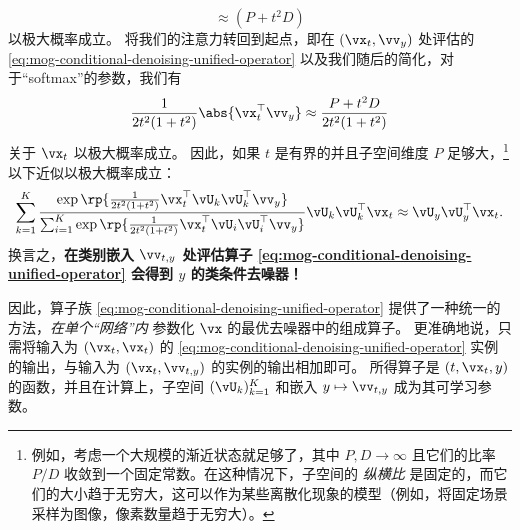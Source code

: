 \documentclass[../../book-main_zh.tex]{subfiles}
\begin{document}
\begin{example}
\begin{equation*}
        \approx
        (P + t^2 D)
    \end{equation*}
    以极大概率成立。
    将我们的注意力转回到起点，即在 $(\vx_t, \vv_y)$ 处评估的 \eqref{eq:mog-conditional-denoising-unified-operator} 以及我们随后的简化，对于“softmax”的参数，我们有
    \begin{equation*}
        {\frac{1}{2t^{2}(1 + t^{2})}\abs{\vx_t^\top \vv_y}}
        \approx
        \frac{P + t^2 D}{2t^{2}(1 + t^{2})}
    \end{equation*}
    关于 $\vx_t$ 以极大概率成立。
    因此，如果 $t$ 是有界的并且子空间维度 $P$ 足够大，\footnote{例如，考虑一个大规模的渐近状态就足够了，其中 $P, D \to \infty$ 且它们的比率 $P/D$ 收敛到一个固定常数。在这种情况下，子空间的 \textit{纵横比} 是固定的，而它们的大小趋于无穷大，这可以作为某些离散化现象的模型（例如，将固定场景采样为图像，像素数量趋于无穷大）。}
    以下近似以极大概率成立：
    \begin{equation}
        \sum_{k = 1}^{K}
        \frac{
            \exp\rp{\frac{1}{2t^{2}(1
            + t^{2})}\vx_t^\top \vU_k \vU_k^\top \vv_y}
        }
        {
            \sum_{i
            = 1}^{K}\exp\rp{\frac{1}{2t^{2}(1
            + t^{2})}\vx_t^\top \vU_i \vU_i^\top \vv_y}
        }
        \vU_{k}\vU_{k}^{\top}\vx_t
        \approx
        \vU_{y}\vU_{y}^{\top}\vx_t.
    \end{equation}
    换言之，\textbf{在类别嵌入 $\vv_{t, y}$ 处评估算子 \eqref{eq:mog-conditional-denoising-unified-operator} 会得到 $y$ 的类条件去噪器！}

    因此，算子族 \eqref{eq:mog-conditional-denoising-unified-operator} 提供了一种统一的方法，\textit{在单个“网络”内} 参数化 $\vx$ 的最优去噪器中的组成算子。
    更准确地说，只需将输入为 $(\vx_t, \vx_t)$ 的 \eqref{eq:mog-conditional-denoising-unified-operator} 实例的输出，与输入为 $(\vx_t, \vv_{t, y})$ 的实例的输出相加即可。
    所得算子是 $(t, \vx_t, y)$ 的函数，并且在计算上，子空间 $(\vU_k)_{k=1}^K$ 和嵌入 $y \mapsto \vv_{t, y}$ 成为其可学习参数。
\end{example}
\end{document}
